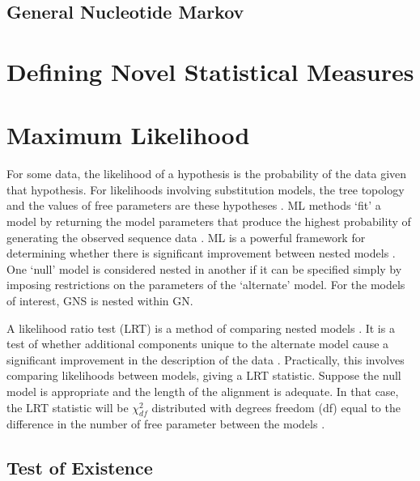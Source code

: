 \subsection{General Nucleotide Markov}

\section{Defining Novel Statistical Measures}

\section{Maximum Likelihood}

For some data, the likelihood of a hypothesis is the probability of the data given that hypothesis. For likelihoods involving substitution models, the tree topology and the values of free parameters are these hypotheses \cite{Lio1998ModelsPhylogeny}. ML methods `fit' a model by returning the model parameters that produce the highest probability of generating the observed sequence data \citep{Edwards1972Likelihood, Felsenstein1981EvolutionaryApproach}. ML is a powerful framework for determining whether there is significant improvement between nested models \cite{Goldman1993StatisticalSubstitution}. One `null' model is considered nested in another if it can be specified simply by imposing restrictions on the parameters of the `alternate' model. For the models of interest, GNS is nested within GN.

A likelihood ratio test (LRT) is a method of comparing nested models \citep{Goldman1993StatisticalSubstitution}. It is a test of whether additional components unique to the alternate model cause a significant improvement in the description of the data \cite{Goldman1993StatisticalSubstitution}. Practically, this involves comparing likelihoods between models, giving a LRT statistic. Suppose the null model is appropriate and the length of the alignment is adequate. In that case, the LRT statistic will be $\chi^2_{df}$ distributed with degrees freedom (df) equal to the difference in the number of free parameter between the models \citep{Lindgren1993StatisticalTheory, Silvey1975StatisticalInference, Kendall1979The2}.

\subsection{Test of Existence}


